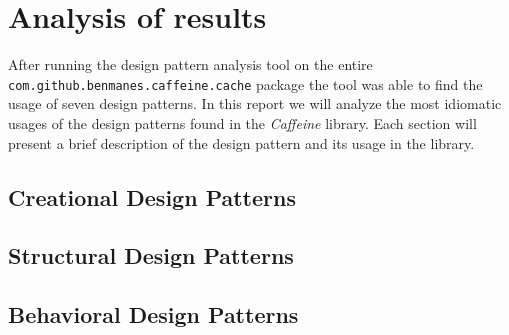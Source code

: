 \section{Analysis of results}

After running the design pattern analysis tool on the entire \texttt{com.github.benmanes.caffeine.cache} package the tool was able to find the usage of seven design patterns. In this report we will analyze the most idiomatic usages of the design patterns found in the \textit{Caffeine} library. Each section will present a brief description of the design pattern and its usage in the library.

\subsection{Creational Design Patterns}



\subsection{Structural Design Patterns}



\subsection{Behavioral Design Patterns}



